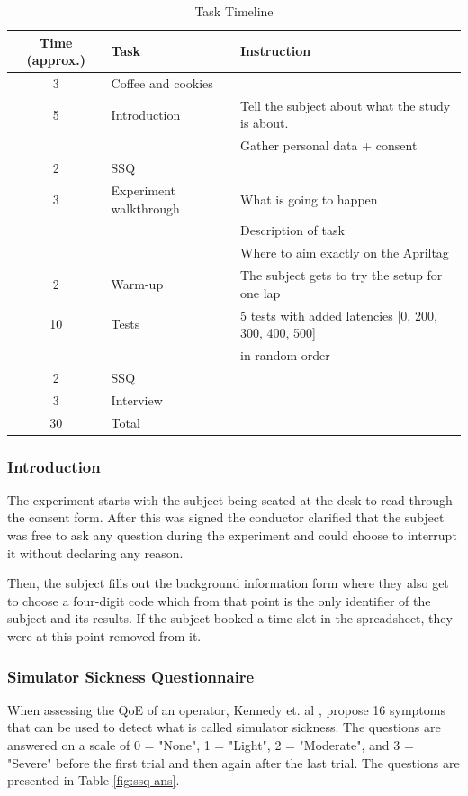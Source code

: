 \documentclass[nofilelist]{cslthse-msc}
\begin{document}
\begin{table}[ht]
   \centering
   \caption{Task Timeline}
   \label{tab:task-timeline}
   \begin{tabular}{|c|l|l|}
   \hline
   \textbf{Time (approx.)} & \textbf{Task} & \textbf{Instruction} \\ \hline
   3 & Coffee and cookies & \\ \hline
   5 & Introduction & Tell the subject about what the study is about. \\
   & & Gather personal data + consent \\ \hline
   2 & SSQ & \\ \hline
   3 & Experiment walkthrough & What is going to happen \\
   & & Description of task \\
   & & Where to aim exactly on the Apriltag \\ \hline
   2 & Warm-up & The subject gets to try the setup for one lap \\ \hline
   10 & Tests & 5 tests with added latencies [0, 200, 300, 400, 500] \\ 
   & & in random order \\ \hline
   2 & SSQ & \\ \hline
   3 & Interview & \\ \hline
   30 & Total & \\ \hline
   \end{tabular}
\end{table}

\subsubsection{Introduction}
The experiment starts with the subject being seated at the desk to read through the consent form. After this was signed the conductor clarified that the subject was free to ask any question during the experiment and could choose to interrupt it without declaring any reason. 

Then, the subject fills out the background information form where they also get to choose a four-digit code which from that point is the only identifier of the subject and its results. If the subject booked a time slot in the spreadsheet, they were at this point removed from it.

\subsubsection{Simulator Sickness Questionnaire}
When assessing the QoE of an operator, Kennedy et. al \cite{ssq}, propose 16 symptoms that can be used to detect what is called simulator sickness. The questions are answered on a scale of 0 = "None", 1 = "Light", 2 = "Moderate", and 3 = "Severe" before the first trial and then again after the last trial. The questions are presented in Table \ref{fig:ssq-ans}.
\end{document}
